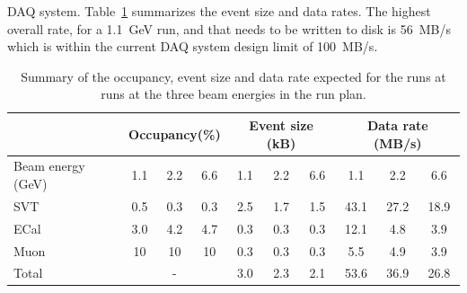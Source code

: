 DAQ system.
Table~\ref{tab:data_rates} summarizes the event size and data rates. The highest overall rate, for a 1.1~GeV run, and that needs to be written to disk is 56~MB/s which is within the current 
DAQ system design limit of 100~MB/s. 
\begin{table}[]
\centering
\begin{tabular}{|l|ccc|ccc|ccc|}
\hline
 & \multicolumn{3}{|c|}{Occupancy(\%)} &  \multicolumn{3}{|c|}{Event size (kB)} &  \multicolumn{3}{|c|}{Data rate (MB/s)} \\
\hline
Beam energy (GeV) & 1.1 & 2.2 & 6.6 & 1.1 & 2.2 & 6.6 & 1.1 & 2.2 & 6.6 \\
\hline
SVT & 0.5 & 0.3  & 0.3  & 2.5 & 1.7 & 1.5 & 43.1 & 27.2 & 18.9\\
ECal & 3.0 & 4.2  & 4.7 & 0.3 & 0.3  & 0.3 & 12.1 & 4.8  & 3.9 \\
Muon & 10 &  10 & 10  & 0.3 & 0.3 & 0.3 & 5.5 & 4.9 & 3.9 \\
\hline
Total& \multicolumn{3}{|c|}{-} & 3.0 & 2.3 & 2.1 & 53.6 & 36.9 & 26.8 \\
\hline
\end{tabular}
\caption{{\small Summary of the occupancy, event size and data rate expected for the runs at  runs at the three beam 
energies in the run plan. }}
\label{tab:data_rates}
\end{table}
